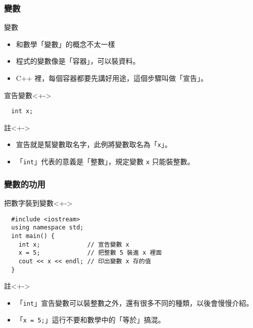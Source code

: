 \documentclass[utf8]{beamer}
\begin{document}
\begin{CJK}{UTF8}{bkai}
\begin{frame}[fragile]
  \frametitle{變數}
  \begin{block}{變數}
    \begin{itemize}[<+->]
    \item 和數學「變數」的概念不太一樣
    \item 程式的變數像是「\alert{容器}」，可以裝資料。
    \item C++ 裡，每個容器都要先講好\alert{用途}，這個步驟叫做「\alert{宣告}」。
    \end{itemize}
  \end{block}
  \begin{alertblock}{宣告變數}<+->
  \begin{lstlisting}
  int x;
  \end{lstlisting}
  \end{alertblock}
  \begin{exampleblock}{註}<+->
    \begin{itemize}
    \item 宣告就是幫變數取名字，此例將變數取名為「\lstinline{x}」。
    \item<+-> 「\lstinline{int}」代表的意義是「\alert{整數}」，規定變數 \lstinline{x} \alert{只能裝整數}。
    \end{itemize}
  \end{exampleblock}
\end{frame}

\begin{frame}[fragile]
  \frametitle{變數的功用}
  \begin{block}{把數字裝到變數}<+->
  \begin{lstlisting}
  #include <iostream>
  using namespace std;
  int main() {
    int x;             // 宣告變數 x
    x = 5;             // 把整數 5 裝進 x 裡面
    cout << x << endl; // 印出變數 x 存的值
  }
  \end{lstlisting}
  \end{block}
  \begin{exampleblock}{註}<+->
    \begin{itemize}
    \item 「\lstinline{int}」宣告變數可以裝整數之外，還有很多不同的種類，以後會慢慢介紹。
    \item<+-> 「\lstinline{x = 5;}」這行\alert{不要}和數學中的「等於」搞混。
    \end{itemize}
  \end{exampleblock}
\end{frame}


\end{CJK}
\end{document}
